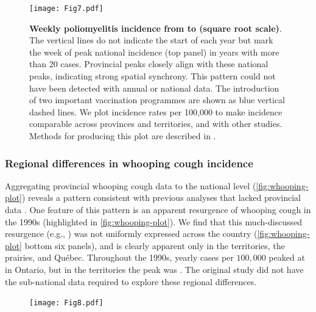 \documentclass[12pt]{article}
\begin{document}
\newpage

\begin{figure}[!ht]
  \texttt{[image: Fig7.pdf]}
  \caption{\textbf{Weekly poliomyelitis incidence from \protect to \protect (square root scale)}. The vertical lines do not indicate the start of each year but mark the week of peak national incidence (top panel) in years with more than 20 cases. Provincial peaks closely align with these national peaks, indicating strong spatial synchrony. This pattern could not have been detected with annual or national data. The introduction of two important vaccination programmes are shown as blue vertical dashed lines. We plot incidence rates per 100,000 to make incidence comparable across provinces and territories, and with other studies. Methods for producing this plot are described in .}\label{fig:polio-plot}
\end{figure}

\newpage

\subsubsection{Regional differences in whooping cough incidence}\label{sec:whooping-cough-results}

Aggregating provincial whooping cough data to the national level (\cref{fig:whooping-plot}) reveals a pattern consistent with previous analyses that lacked provincial data \cite{thommes2020revisiting}. One feature of this pattern is an apparent resurgence of whooping cough in the 1990s (highlighted in \cref{fig:whooping-plot}). We find that this much-discussed resurgence (e.g., \cite{thommes2020revisiting}) was not uniformly expressed across the country (\cref{fig:whooping-plot} bottom six panels), and is clearly apparent only in the territories, the prairies, and Qu\'ebec. Throughout the 1990s, yearly cases per $100,000$ peaked at  in Ontario, but in the territories the peak was . The original study \cite{thommes2020revisiting} did not have the sub-national data required to explore these regional differences.

\newpage

\begin{figure}[!ht]
  \texttt{[image: Fig8.pdf]}
\end{figure}

\newpage
\end{document}
